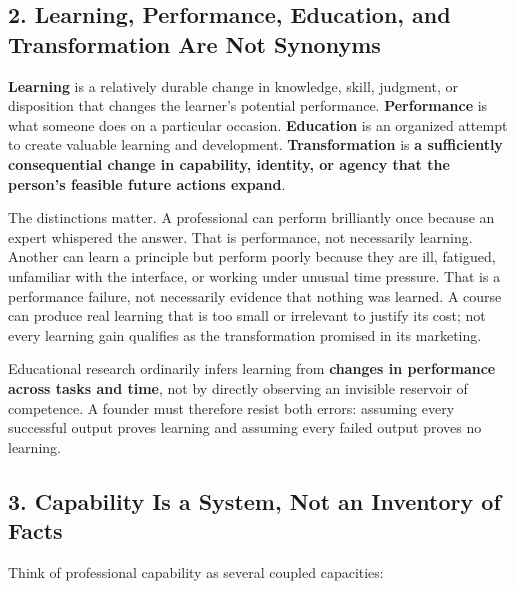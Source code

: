 \subsection*{2. Learning, Performance, Education, and Transformation Are Not Synonyms}

\textbf{Learning} is a relatively durable change in knowledge, skill, judgment, or disposition that changes the learner's potential performance. \textbf{Performance} is what someone does on a particular occasion. \textbf{Education} is an organized attempt to create valuable learning and development. \textbf{Transformation} is \textbf{a sufficiently consequential change in capability, identity, or agency that the person's feasible future actions expand}.

The distinctions matter. A professional can perform brilliantly once because an expert whispered the answer. That is performance, not necessarily learning. Another can learn a principle but perform poorly because they are ill, fatigued, unfamiliar with the interface, or working under unusual time pressure. That is a performance failure, not necessarily evidence that nothing was learned. A course can produce real learning that is too small or irrelevant to justify its cost; not every learning gain qualifies as the transformation promised in its marketing.

Educational research ordinarily infers learning from \textbf{changes in performance across tasks and time}, not by directly observing an invisible reservoir of competence. A founder must therefore resist both errors: assuming every successful output proves learning and assuming every failed output proves no learning.

\subsection*{3. Capability Is a System, Not an Inventory of Facts}

Think of professional capability as several coupled capacities:

